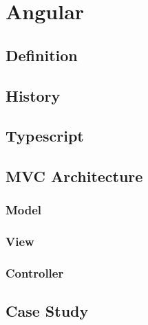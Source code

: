 
\chapter{Angular} %

\label{Chapter4} %


\section{Definition}


\section{History}

\section{Typescript}

\section{MVC Architecture}

\subsection{Model}

\subsection{View}

\subsection{Controller}

\section{Case Study}


